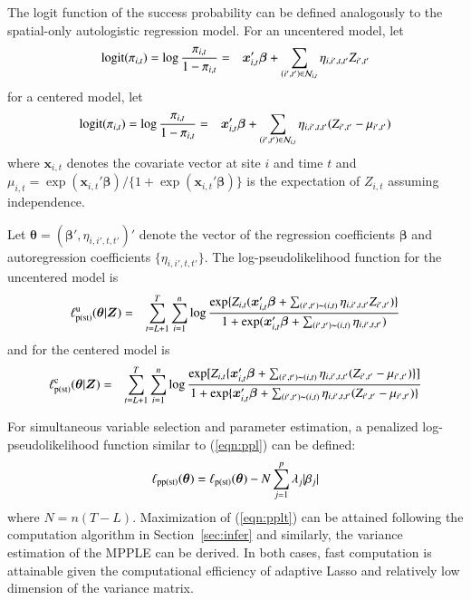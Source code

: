 \documentclass[authoryear,review, 12pt]{elsarticle}
\begin{document}
The logit function of the success probability can be defined analogously to the spatial-only autologistic regression model.  For an uncentered model, let
\begin{eqnarray}
{\rm logit}(\pi_{i,t}) = \log\frac{\pi_{i,t}}{1-\pi_{i,t}} &=&  \bm{x}_{i,t}'\bm{\beta}+\sum_{(i',t')\in\mathcal{N}_{i,t}}\eta_{i,i',t,t'}Z_{i',t'}
\label{eqn:stlogit}
\end{eqnarray}
for a centered model, let
\begin{eqnarray}
{\rm logit}(\pi_{i,t}) = \log\frac{\pi_{i,t}}{1-\pi_{i,t}} &=&  \bm{x}_{i,t}'\bm{\beta}+\sum_{(i',t')\in\mathcal{N}_{i,t}}\eta_{i,i',t,t'}(Z_{i',t'}-\mu_{i',t'})
\label{eqn:stlogitCenter}
\end{eqnarray}
where $\bm{x}_{i,t}$ denotes the covariate vector at site $i$ and time $t$ and $\mu_{i,t}=\exp(\bm{x}_{i,t}'\bm{\beta})/\{1+\exp(\bm{x}_{i,t}'\bm{\beta})\}$ is the expectation of $Z_{i,t}$ assuming independence.

Let $\bm{\theta}=(\bm{\beta}',\eta_{i,i',t,t'})'$ denote the vector of the regression coefficients $\bm{\beta}$ and autoregression coefficients $\{\eta_{i,i',t,t'}\}$. The log-pseudolikelihood function for the uncentered model is 
\begin{eqnarray}
\ell_{\rm p(st)}^{\rm u}(\bm{\theta}|\bm{Z})&=&\sum_{t=L+1}^T\sum_{i=1}^n\log\frac{\exp\{Z_{i,t}(\bm{x}_{i,t}'\bm{\beta}+\sum_{(i',t')\thicksim(i,t)}\eta_{i,i',t,t'} Z_{i',t'})\}}{1+\exp(\bm{x}_{i,t}'\bm{\beta}+\sum_{(i',t')\thicksim(i,t)}\eta_{i,i',t,t'})}
\end{eqnarray}
and for the centered model is
\begin{eqnarray}
\ell_{\rm p(st)}^{\rm c}(\bm{\theta}|\bm{Z})&=&\sum_{t=L+1}^T\sum_{i=1}^n\log\frac{\exp[Z_{i,t}\{ \bm{x}_{i,t}'\bm{\beta}+\sum_{(i',t')\thicksim(i,t)}\eta_{i,i',t,t'}(Z_{i',t'}-\mu_{i',t'})\}]}{1+\exp\{\bm{x}_{i,t}'\bm{\beta}
+\sum_{(i',t')\thicksim(i,t)}\eta_{i,i',t,t'}(Z_{i',t'}-\mu_{i',t'})\}}
\end{eqnarray}

For simultaneous variable selection and parameter estimation, a penalized log-pseudolikelihood function similar to (\ref{eqn:ppl}) can be defined:
\begin{eqnarray}
\ell_{\rm pp(st)}(\bm{\theta})= \ell_{\rm p(st)}(\bm{\theta})-N\sum_{j=1}^{p}\lambda_j|\beta_j|
\label{eqn:pplt}
\end{eqnarray}
where $N=n(T-L)$.  Maximization of (\ref{eqn:pplt}) can be attained following the computation algorithm in Section~\ref{sec:infer} and similarly, the variance estimation of the MPPLE can be derived.  In both cases, fast computation is attainable given the computational efficiency of adaptive Lasso and relatively low dimension of the variance matrix.
\end{document}
